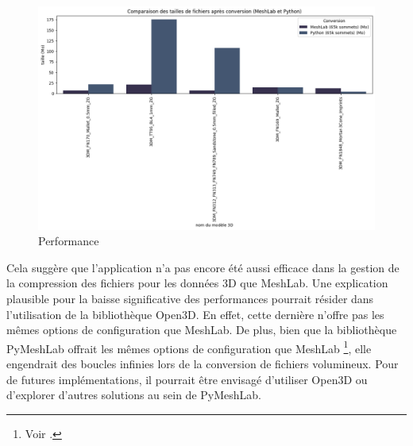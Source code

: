         \begin{table}[htbp]
        \centering
        \caption{Comparaison des tailles de fichiers avant et après conversion avec MeshLab et \msh}
        \end{table}

        \begin{figure}[h!]
            \centering
            \includegraphics[width=13cm]{02_images/part_03/04_msh_dv.png}
            \caption{Performance \msh}
        \end{figure}

        Cela suggère que l'application \py \msh n'a pas encore été aussi efficace dans la gestion de la compression des fichiers pour les données 3D que MeshLab. Une explication plausible pour la baisse significative des performances pourrait résider dans l'utilisation de la bibliothèque Open3D. En effet, cette dernière n'offre pas les mêmes options de configuration que MeshLab. De plus, bien que la bibliothèque PyMeshLab offrait les mêmes options de configuration que MeshLab \footnote{Voir \cite{pymeshlab_decimation}.}, elle engendrait des boucles infinies lors de la conversion de fichiers volumineux. Pour de futures implémentations, il pourrait être envisagé d'utiliser Open3D ou d'explorer d'autres solutions au sein de PyMeshLab.
        
